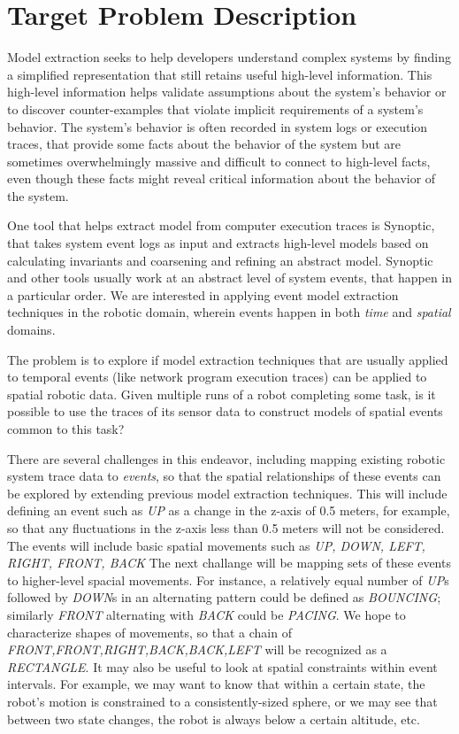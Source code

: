 \documentclass{article}
\begin{document}
\section{Target Problem Description}
\cite{schneider2010synoptic}



Model extraction seeks to help developers understand complex systems by finding a simplified representation that still retains useful high-level information.
This high-level information helps validate assumptions about the system's behavior or to discover counter-examples that violate implicit requirements of a system's behavior.
The system's behavior is often recorded in system logs or execution traces, that provide some facts about the behavior of the system but are sometimes overwhelmingly massive and difficult to connect to high-level facts, even though these facts might reveal critical information about the behavior of the system.

One tool that helps extract model from computer execution traces is Synoptic, that takes system event logs as input and extracts high-level models based on calculating invariants and coarsening and refining an abstract model.
Synoptic and other tools usually work at an abstract level of system events, that happen in a particular order.
We are interested in applying event model extraction techniques in the robotic domain, wherein events happen in both \emph{time} and \emph{spatial} domains.

The problem is to explore if model extraction techniques that are usually applied to temporal events (like network program execution traces) can be applied to spatial robotic data.
Given multiple runs of a robot completing some task, is it possible to use the traces of its sensor data to construct models of spatial events common to this task?

There are several challenges in this endeavor, including mapping existing robotic system trace data to \emph{events}, so that the spatial relationships of these events can be explored by extending previous model extraction techniques. 
This will include defining an event such as \emph{UP} as a change in the z-axis of 0.5 meters, for example, so that any fluctuations in the z-axis less than 0.5 meters will not be considered.  
The events will include basic spatial movements such as \emph{UP, DOWN, LEFT, RIGHT, FRONT, BACK} 
The next challange will be mapping sets of these events to higher-level spacial movements.  
For instance, a relatively equal number of \emph{UP}s followed by \emph{DOWN}s in an alternating pattern could be defined as \emph{BOUNCING}; similarly \emph{FRONT} alternating with \emph{BACK} could be \emph{PACING}.
We hope to characterize shapes of movements, so that a chain of \emph{FRONT,FRONT,RIGHT,BACK,BACK,LEFT} will be recognized as a \emph{RECTANGLE}.
It may also be useful to look at spatial constraints within event intervals.  
For example, we may want to know that within a certain state, the robot's motion is constrained to a consistently-sized sphere, or we may see that between two state changes, the robot is always below a certain altitude, etc.
\end{document}
